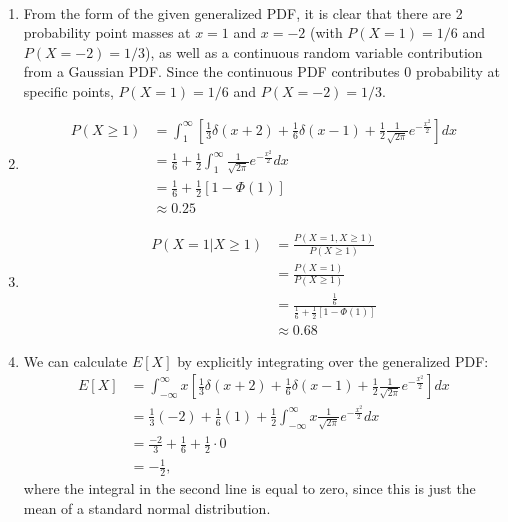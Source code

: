 \begin{problem}{15} $ $

\begin{enumerate}
\item

From the form of the given generalized PDF, it is clear that there are 2 probability point masses at $x=1$ and $x=-2$ (with $P(X=1)=1/6$ and $P(X=-2)=1/3$), as well as a continuous random variable contribution from a Gaussian PDF.  Since the continuous PDF contributes 0 probability at specific points, $P(X=1)=1/6$ and $P(X=-2)=1/3$.


\item

\begin{align*}
P(X \ge 1)& = \int_1^{\infty} \left [ \frac{1}{3}\delta(x+2) +\frac{1}{6}\delta(x-1)+\frac{1}{2}\frac{1}{\sqrt{2 \pi}}e^{-\frac{x^2}{2}} \right] dx \\
& = \frac{1}{6}+\frac{1}{2}\int_{1}^\infty  \frac{1}{\sqrt{2 \pi}}e^{-\frac{x^2}{2}}dx \\
& = \frac{1}{6}+\frac{1}{2} \left [ 1-\Phi(1) \right] \\
& \approx 0.25
\end{align*}

\item

\begin{align*}
P(X=1|X \ge 1) &= \frac{P(X=1, X \ge 1)}{P(X \ge 1)} \\
&= \frac{P(X=1)}{P(X \ge 1)} \\
&= \frac{\frac{1}{6}}{ \frac{1}{6}+\frac{1}{2} \left [ 1-\Phi(1) \right]} \\
& \approx 0.68
\end{align*}

\item We can calculate $E[X]$ by explicitly integrating over the generalized PDF:
\begin{align*}
E[X] & = \int_{-\infty}^{\infty} x \left [ \frac{1}{3}\delta(x+2) +\frac{1}{6}\delta(x-1)+\frac{1}{2}\frac{1}{\sqrt{2 \pi}}e^{-\frac{x^2}{2}} \right] dx\\
& = \frac{1}{3}(-2)+\frac{1}{6}(1)+\frac{1}{2}\int_{-\infty}^{\infty} x \frac{1}{\sqrt{2 \pi}}e^{-\frac{x^2}{2}} dx \\
& = \frac{-2}{3} +\frac{1}{6}+\frac{1}{2}\cdot 0 \\
& = -\frac{1}{2},
\end{align*}
where the integral in the second line is equal to zero, since this is just the mean of a standard normal distribution.


\end{enumerate}
\end{problem}
